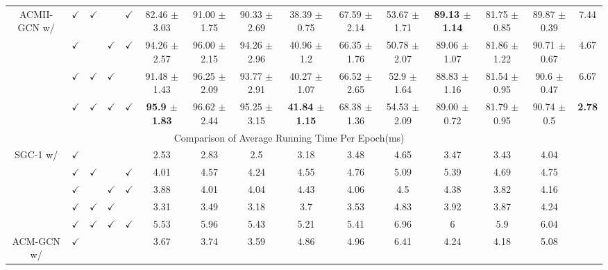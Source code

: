 \documentclass{article}
\newcommand{\0}{{\boldsymbol{0}}}
\newcommand{\6}{{\partial}}
\newcommand{\8}{{\infty}}
\newcommand{\4}{{\nabla}}
\begin{document}
\begin{table}[htbp]
\begin{tabular}{c|cccc|ccccccccc|r}
          \midrule
    \multicolumn{1}{c|}{\multirow{4}[1]{*}{ACMII-GCN w/}} & $\checkmark$ & $\checkmark$ &       & $\checkmark$ & 82.46 $\pm$ 3.03 & 91.00 $\pm$ 1.75 & 90.33 $\pm$ 2.69 & 38.39 $\pm$ 0.75 & 67.59 $\pm$ 2.14 & 53.67 $\pm$ 1.71 & \cellcolor[rgb]{ .816,  .808,  .808}\textbf{89.13 $\pm$ 1.14} & 81.75 $\pm$ 0.85 & 89.87 $\pm$ 0.39 & \multicolumn{1}{c}{7.44} \\
          & $\checkmark$ &       & $\checkmark$ & $\checkmark$ & 94.26 $\pm$ 2.57 & 96.00 $\pm$ 2.15 & 94.26 $\pm$ 2.96 & 40.96 $\pm$ 1.2 & 66.35 $\pm$ 1.76 & 50.78 $\pm$ 2.07 & 89.06 $\pm$ 1.07 & 81.86 $\pm$ 1.22 & 90.71 $\pm$ 0.67 & \multicolumn{1}{c}{4.67} \\
          & $\checkmark$ & $\checkmark$ & $\checkmark$ &       & 91.48 $\pm$ 1.43 & 96.25 $\pm$ 2.09 & 93.77 $\pm$ 2.91 & 40.27 $\pm$ 1.07 & 66.52 $\pm$ 2.65 & 52.9 $\pm$ 1.64 & 88.83 $\pm$ 1.16 & 81.54 $\pm$ 0.95 & 90.6 $\pm$ 0.47 & \multicolumn{1}{c}{6.67} \\
          & $\checkmark$ & $\checkmark$ & $\checkmark$ & $\checkmark$ & \cellcolor[rgb]{ .816,  .808,  .808}\textbf{95.9 $\pm$ 1.83} & 96.62 $\pm$ 2.44 & 95.25 $\pm$ 3.15 & \cellcolor[rgb]{ .816,  .808,  .808}\textbf{41.84 $\pm$ 1.15} & 68.38 $\pm$ 1.36 & 54.53 $\pm$ 2.09 & 89.00 $\pm$ 0.72 & 81.79 $\pm$ 0.95 & 90.74 $\pm$ 0.5 & \multicolumn{1}{c}{\cellcolor[rgb]{ .816,  .808,  .808}\textbf{2.78}} \\
\cmidrule{1-14}    \multicolumn{14}{c|}{Comparison of Average Running Time Per Epoch(ms)}                                        &  \\
\cmidrule{1-14}    \multicolumn{1}{c|}{\multirow{5}[2]{*}{SGC-1 w/}} & $\checkmark$ &       &       &       & 2.53  & 2.83  & 2.5   & 3.18  & 3.48  & 4.65  & 3.47  & 3.43  & 4.04  &  \\
          & $\checkmark$ & $\checkmark$ &       & $\checkmark$ & 4.01  & 4.57  & 4.24  & 4.55  & 4.76  & 5.09  & 5.39  & 4.69  & 4.75  &  \\
          & $\checkmark$ &       & $\checkmark$ & $\checkmark$ & 3.88  & 4.01  & 4.04  & 4.43  & 4.06  & 4.5   & 4.38  & 3.82  & 4.16  &  \\
          & $\checkmark$ & $\checkmark$ & $\checkmark$ &       & 3.31  & 3.49  & 3.18  & 3.7   & 3.53  & 4.83  & 3.92  & 3.87  & 4.24  &  \\
          & $\checkmark$ & $\checkmark$ & $\checkmark$ & $\checkmark$ & 5.53  & 5.96  & 5.43  & 5.21  & 5.41  & 6.96  & 6     & 5.9   & 6.04  &  \\
\cmidrule{1-14}    \multicolumn{1}{c|}{\multirow{5}[2]{*}{ACM-GCN w/}} & $\checkmark$ &       &       &       & 3.67  & 3.74  & 3.59  & 4.86  & 4.96  & 6.41  & 4.24  & 4.18  & 5.08  &  \\

\end{tabular}
\end{table}
\end{document}
